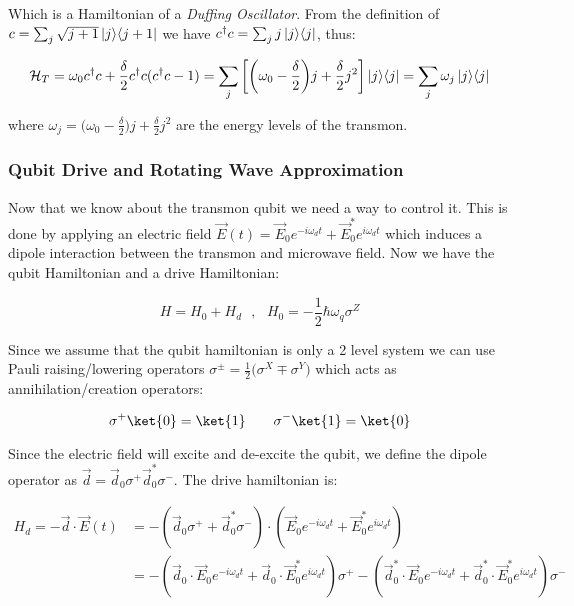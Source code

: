 Which is a Hamiltonian of a \textit{Duffing Oscillator}. From the definition of $c = \sum_j \sqrt{j+1} \left\vert{j}\middle\rangle\middle\langle{j+1}\right\vert$ we have $c^\dagger c = \sum_j j \left\vert{j}\middle\rangle\middle\langle{j}\right\vert$, thus:

\begin{equation}
    \mathcal{H}_T = \omega_0 c^\dagger c + \frac{\delta}{2} c^\dagger c ( c^\dagger c - 1) = \sum_j \bigg[ \bigg( \omega_0 - \frac{\delta}{2} \bigg)j + \frac{\delta}{2} j^2 \bigg] \left\vert{j}\middle\rangle\middle\langle{j}\right\vert = \sum_j \omega_j \left\vert{j}\middle\rangle\middle\langle{j}\right\vert
\end{equation}

where $\omega_j = \big(\omega_0 - \frac{\delta}{2} \big) j + \frac{\delta}{2}j^2$ are the energy levels of the transmon.

\subsubsection{Qubit Drive and Rotating Wave Approximation}
\label{Subsubsec: Qubit Drive and Rotating Wave Approximation}

Now that we know about the transmon qubit we need a way to control it. This is done by applying an electric field $\Vec{E}(t) = \Vec{E}_0 e^{-i \omega_d t} + \Vec{E}_0^* e^{i \omega_d t}$ which induces a dipole interaction between the transmon and microwave field. Now we have the qubit Hamiltonian and a drive Hamiltonian:

\begin{equation}
    H = H_0 + H_d \ \ \ , \ \ \ H_0 = - \frac{1}{2}\hbar \omega_q \sigma^Z
\end{equation}

Since we assume that the qubit hamiltonian is only a 2 level system we can use Pauli raising/lowering operators $\sigma^{\pm} = \frac{1}{2} \big( \sigma^X \mp \sigma^Y \big)$ which acts as annihilation/creation operators:

\begin{equation}
    \sigma^+ \ket{0} = \ket{1} \ \ \ \ \ \ \sigma^- \ket{1} = \ket{0}
\end{equation}

Since the electric field will excite and de-excite the qubit, we define the dipole operator as $\Vec{d} = \Vec{d}_0 \sigma^ + \Vec{d}_0^* \sigma^- $. The drive hamiltonian is:

\begin{equation*}
    \begin{split}
    H_d = - \Vec{d}\cdot \Vec{E}(t) & = - (\Vec{d}_0 \sigma^ + + \Vec{d}_0^* \sigma^-) \cdot (\Vec{E}_0 e^{-i \omega_d t} + \Vec{E}_0^* e^{i \omega_d t}) \\
    & = - (\Vec{d}_0 \cdot \Vec{E}_0 e^{-i \omega_d t} + \Vec{d}_0 \cdot \Vec{E}_0^* e^{i \omega_d t}) \sigma^+ - (\Vec{d}_0^* \cdot \Vec{E}_0 e^{-i \omega_d t} + \Vec{d}_0^* \cdot \Vec{E}_0^* e^{i \omega_d t}) \sigma^- 
    \end{split}
\end{equation*}

